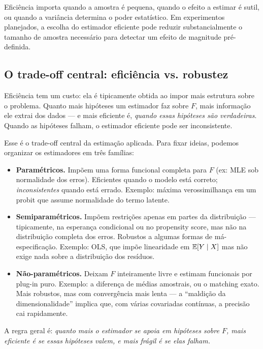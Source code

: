 Eficiência importa quando a amostra é pequena, quando o efeito a estimar é sutil, ou quando a variância determina o poder estatístico. Em experimentos planejados, a escolha do estimador eficiente pode reduzir substancialmente o tamanho de amostra necessário para detectar um efeito de magnitude pré-definida.

\subsection*{O trade-off central: eficiência vs. robustez}

Eficiência tem um custo: ela é tipicamente obtida ao impor mais estrutura sobre o problema. Quanto mais hipóteses um estimador faz sobre $F$, mais informação ele extrai dos dados --- e mais eficiente é, \textit{quando essas hipóteses são verdadeiras}. Quando as hipóteses falham, o estimador eficiente pode ser inconsistente.

Esse é o trade-off central da estimação aplicada. Para fixar ideias, podemos organizar os estimadores em três famílias:

\begin{itemize}
  \item \textbf{Paramétricos.} Impõem uma forma funcional completa para $F$ (ex: MLE sob normalidade dos erros). Eficientes quando o modelo está correto; \textit{inconsistentes} quando está errado. Exemplo: máxima verossimilhança em um probit que assume normalidade do termo latente.

  \item \textbf{Semiparamétricos.} Impõem restrições apenas em partes da distribuição --- tipicamente, na esperança condicional ou no propensity score, mas não na distribuição completa dos erros. Robustos a algumas formas de má-especificação. Exemplo: OLS, que impõe linearidade em $\mathbb{E}[Y \mid X]$ mas não exige nada sobre a distribuição dos resíduos.

  \item \textbf{Não-paramétricos.} Deixam $F$ inteiramente livre e estimam funcionais por plug-in puro. Exemplo: a diferença de médias amostrais, ou o matching exato. Mais robustos, mas com convergência mais lenta --- a ``maldição da dimensionalidade'' implica que, com várias covariadas contínuas, a precisão cai rapidamente.
\end{itemize}

A regra geral é: \textit{quanto mais o estimador se apoia em hipóteses sobre $F$, mais eficiente é se essas hipóteses valem, e mais frágil é se elas falham.}

